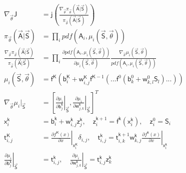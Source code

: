 \begin{align}
	\nabla_{\vec{\theta}} \mathsf{J} &= \mathsf{j}\left(\frac{\nabla_{\vec{\theta}}\pi_{\vec{\theta}}(\vec{\mathsf{A}}|\vec{\mathsf{S}})} {\pi_{\vec{\theta}}(\vec{\mathsf{A}}|\vec{\mathsf{S}})}\right) \label{eq:grad_f}\\
	\pi_{\vec{\theta}}(\vec{\mathsf{A}}|\vec{\mathsf{S}}) &= \prod_i pdf(\mathsf{A}_i, \mu_i(\vec{\mathsf{S}},\vec{\theta})) \label{eq:policy}\\	\frac{\nabla_{\vec{\theta}}\pi_{\vec{\theta}}(\vec{\mathsf{A}}|\vec{\mathsf{S}})} {\pi_{\vec{\theta}}(\vec{\mathsf{A}}|\vec{\mathsf{S}})} &= \prod_i \frac{\partial pdf(\mathsf{A}_i, \mu_i(\vec{\mathsf{S}},\vec{\theta}))}{\partial \mu_i(\vec{\mathsf{S}}, \vec{\theta})} \frac{\nabla_{\vec{\theta}} \mu_i(\vec{\mathsf{S}},\vec{\theta})}{pdf(\mathsf{A}_i, \mu_i(\vec{\mathsf{S}}, \vec{\theta}))} \label{eq:logit}\\
	\mu_i(\vec{\mathsf{S}}, \vec{\theta}) &= \mathsf{f}^\mathsf{\mathsf{K}} ( \mathsf{b}^\mathsf{K}_i+\mathsf{w}^\mathsf{K}_{i,j} \mathsf{f}^{\mathsf{K}-1} (...\mathsf{f}^{0}(\mathsf{b}^0_k + \mathsf{w}^0_{k,l}\mathsf{S}_l)...)) \label{eq:backprop1} \\
	\nabla_{\vec{\theta}} \mu_i |_{\vec{\mathsf{S}}} &= \left[\left. \frac{\partial \mu_i}{\partial \mathsf{b}^\mathsf{k}_j} \right|_{\vec{\mathsf{S}}}, 
	\left.\frac{\partial \mu_i}{\partial \mathsf{w}^\mathsf{k}_{j,k}}\right|_{\vec{\mathsf{S}}} \right]^T \label{eq:backprop2}\\
	\mathsf{x}^\mathsf{k}_i &= \mathsf{b}^{\mathsf{k}}_i + \mathsf{w}^{\mathsf{k}}_{i,j}\mathsf{z}^\mathsf{\mathsf{k}}_j, \quad \mathsf{z}^{\mathsf{k}+1}_i = \mathsf{f}^\mathsf{k}(\mathsf{x}^\mathsf{k}_i), \quad \mathsf{z}^0_i = \mathsf{S}_i \\
	\mathsf{t}^\mathsf{K}_{i,j} &= \left.\frac{\partial f^\mathsf{K}(x)}{\partial x}\right|_{\mathsf{x}^\mathsf{K}_i} \delta_{i,j}, \quad \left.\mathsf{t}^{\mathsf{k}}_{i,j} = \mathsf{t}^{\mathsf{k}+1}_{i,k} \mathsf{w}^\mathsf{k}_{k,j} \frac{\partial f^\mathsf{k}(x)}{\partial x}\right|_{\mathsf{x}^\mathsf{k}_i} \\
	\left. \frac{\partial \mu_i}{\partial \mathsf{b}^\mathsf{k}_j}\right|_{\vec{\mathsf{S}}} &= \mathsf{t}^\mathsf{k}_{i,j}, \quad \left. \frac{\partial \mu_i}{\partial \mathsf{w}^\mathsf{k}_{j,k}} \right|_{\vec{\mathsf{S}}} = \mathsf{t}^\mathsf{k}_{i,j} \mathsf{z}^\mathsf{k}_k
\end{align}